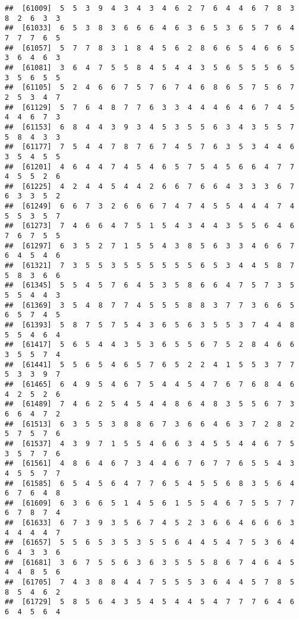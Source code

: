 \documentclass[
]{book}
\begin{document}
\begin{verbatim}
##  [61009]  5  5  3  9  4  3  4  3  4  6  2  7  6  4  4  6  7  8  3  8  2  6  3  3
##  [61033]  6  5  3  8  3  6  6  6  4  6  3  6  5  3  6  5  7  6  4  7  7  7  6  5
##  [61057]  5  7  7  8  3  1  8  4  5  6  2  8  6  6  5  4  6  6  5  3  6  4  6  3
##  [61081]  3  6  4  7  5  5  8  4  5  4  4  3  5  6  5  5  5  6  5  3  5  6  5  5
##  [61105]  5  2  4  6  6  7  5  7  6  7  4  6  8  6  5  7  5  6  7  2  5  3  4  7
##  [61129]  5  7  6  4  8  7  7  6  3  3  4  4  4  6  4  6  7  4  5  4  4  6  7  3
##  [61153]  6  8  4  4  3  9  3  4  5  3  5  5  6  3  4  3  5  5  7  5  8  4  3  3
##  [61177]  7  5  4  4  7  8  7  6  7  4  5  7  6  3  5  3  4  4  6  3  5  4  5  5
##  [61201]  4  6  4  4  7  4  5  4  6  5  7  5  4  5  6  6  4  7  7  4  5  5  2  6
##  [61225]  4  2  4  4  5  4  4  2  6  6  7  6  6  4  3  3  3  6  7  6  3  3  5  2
##  [61249]  6  6  7  3  2  6  6  6  7  4  7  4  5  5  4  4  4  7  4  5  5  3  5  7
##  [61273]  7  4  6  6  4  7  5  1  5  4  3  4  4  3  5  5  6  4  6  7  6  7  5  5
##  [61297]  6  3  5  2  7  1  5  5  4  3  8  5  6  3  3  4  6  6  7  6  4  5  4  6
##  [61321]  7  3  5  5  3  5  5  5  5  5  5  6  5  3  4  4  5  8  7  5  8  3  6  6
##  [61345]  5  5  4  5  7  6  4  5  3  5  8  6  6  4  7  5  7  3  5  5  5  4  4  3
##  [61369]  3  5  4  8  7  7  4  5  5  5  8  8  3  7  7  3  6  6  5  6  5  7  4  5
##  [61393]  5  8  7  5  7  5  4  3  6  5  6  3  5  5  3  7  4  4  8  5  5  4  6  4
##  [61417]  5  6  5  4  4  3  5  3  6  5  5  6  7  5  2  8  4  6  6  3  5  5  7  4
##  [61441]  5  5  6  5  4  6  5  7  6  5  2  2  4  1  5  5  3  7  7  5  3  3  9  7
##  [61465]  6  4  9  5  4  6  7  5  4  4  5  4  7  6  7  6  8  4  6  4  2  5  2  6
##  [61489]  7  4  6  2  5  4  5  4  4  8  6  4  8  3  5  5  6  7  3  6  6  4  7  2
##  [61513]  6  3  5  5  3  8  8  6  7  3  6  6  4  6  3  7  2  8  2  5  7  5  7  6
##  [61537]  4  3  9  7  1  5  5  4  6  6  3  4  5  5  4  4  6  7  5  3  5  7  7  6
##  [61561]  4  8  6  4  6  7  3  4  4  6  7  6  7  7  6  5  5  4  3  4  5  5  7  7
##  [61585]  6  5  4  5  6  4  7  7  6  5  4  5  5  6  8  3  5  6  4  6  7  6  4  8
##  [61609]  6  3  6  6  5  1  4  5  6  1  5  5  4  6  7  5  5  7  7  6  7  8  7  4
##  [61633]  6  7  3  9  3  5  6  7  4  5  2  3  6  6  4  6  6  6  3  4  4  4  4  7
##  [61657]  5  5  6  5  3  5  3  5  5  6  4  4  5  4  7  5  3  6  4  6  4  3  3  6
##  [61681]  3  6  7  5  5  6  3  6  3  5  5  5  8  6  7  4  6  4  5  4  4  8  5  6
##  [61705]  7  4  3  8  8  4  4  7  5  5  5  3  6  4  4  5  7  8  5  8  5  4  6  2
##  [61729]  5  8  5  6  4  3  5  4  5  4  4  5  4  7  7  7  6  4  6  6  4  5  6  4

\end{verbatim}
\end{document}
